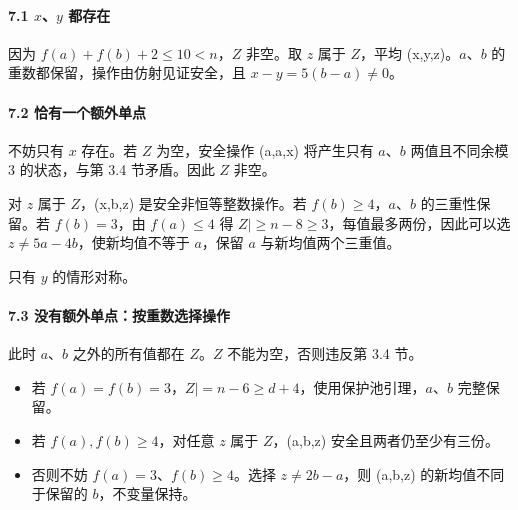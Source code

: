 \documentclass[11pt,a4paper]{article}
\newcommand{\tightlist}{\setlength{\itemsep}{0pt}\setlength{\parskip}{0pt}}
\theoremstyle{definition}
\numberwithin{equation}{section}
\begin{document}
\paragraph*{\texorpdfstring{{7.1} {\ensuremath{x}、\ensuremath{y}} {都存在}}{7.1 、 都存在}}\label{C33-h222}

{因为} {\ensuremath{f(a)+f(b)+2\le 10<n}，\ensuremath{Z}} {非空。取} {\ensuremath{z}} {属于} {\ensuremath{Z}，平均} {(x,y,z)。\ensuremath{a}、\ensuremath{b}} {的重数都保留，操作由仿射见证安全，且} {\ensuremath{x-y=5(b-a)\ne 0}。}

\paragraph*{\texorpdfstring{{7.2} {恰有一个额外单点}}{7.2 恰有一个额外单点}}\label{C33-h223}

{不妨只有} {\ensuremath{x}} {存在。若} {\ensuremath{Z}} {为空，安全操作} {(a,a,x)} {将产生只有} {\ensuremath{a}、\ensuremath{b}} {两值且不同余模} {3} {的状态，与第} {3.4} {节矛盾。因此} {\ensuremath{Z}} {非空。}

{对} {\ensuremath{z}} {属于} {\ensuremath{Z}，(x,b,z)} {是安全非恒等整数操作。若} {\ensuremath{f(b)\ge 4}，\ensuremath{a}、\ensuremath{b}} {的三重性保留。若} {\ensuremath{f(b)=3}，由} {\ensuremath{f(a)\le 4}} {得} {\textbar{}\ensuremath{Z|\ge n-8\ge 3}，每值最多两份，因此可以选} {\ensuremath{z\ne 5a-4b}，使新均值不等于} {\ensuremath{a}，保留} {\ensuremath{a}} {与新均值两个三重值。}

{只有} {\ensuremath{y}} {的情形对称。}

\paragraph*{\texorpdfstring{{7.3} {没有额外单点：按重数选择操作}}{7.3 没有额外单点：按重数选择操作}}\label{C33-h224}

{此时} {\ensuremath{a}、\ensuremath{b}} {之外的所有值都在} {\ensuremath{Z}。\ensuremath{Z}} {不能为空，否则违反第} {3.4} {节。}

\begin{itemize}
\tightlist
\item
  {若} {\ensuremath{f(a)=f(b)=3}，\textbar{}\ensuremath{Z|=n-6\ge d+4}，使用保护池引理，\ensuremath{a}、\ensuremath{b}} {完整保留。}
\item
  {若} {\ensuremath{f(a),f(b)\ge 4}，对任意} {\ensuremath{z}} {属于} {\ensuremath{Z}，(a,b,z)} {安全且两者仍至少有三份。}
\item
  {否则不妨} {\ensuremath{f(a)=3}、\ensuremath{f(b)\ge 4}。选择} {\ensuremath{z\ne 2b-a}，则} {(a,b,z)} {的新均值不同于保留的} {\ensuremath{b}，不变量保持。}
\end{itemize}
\end{document}
